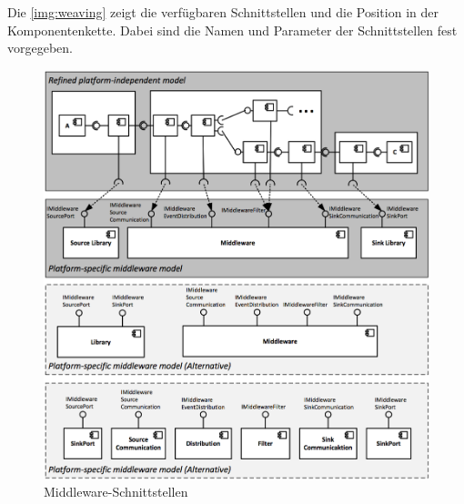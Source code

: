 Die \autoref{img:weaving} zeigt die verfügbaren Schnittstellen und die Position in der Komponentenkette. Dabei sind die Namen und Parameter der Schnittstellen fest vorgegeben. 

\begin{figure}
\center
  \includegraphics[width=1\textwidth]{images/grundlagen/middleware-model-weaving.png}
  \caption{Middleware-Schnittstellen}
  \label{img:weaving}
\end{figure}


